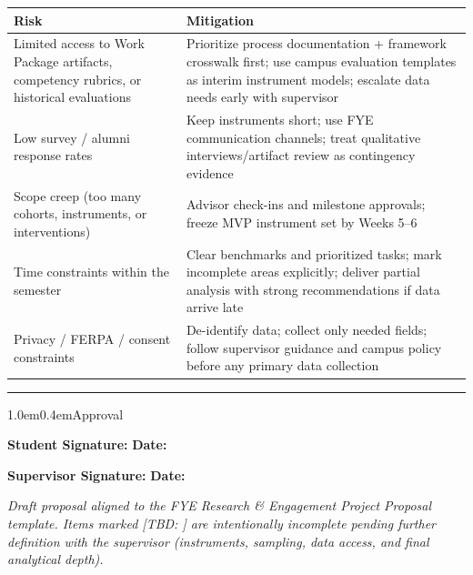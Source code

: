 \documentclass[11pt,letterpaper]{article}
\makeatletter
\newcommand{\sectionrule}{\par\vspace{0.4em}\noindent\rule{\textwidth}{0.6pt}\vspace{0.55em}}
\newcommand{\tbdtxt}[1]{%
  \textit{[TBD\if\relax\detokenize{#1}\relax\else: #1\fi]}%
}
\renewcommand\section{\@startsection{section}{1}{\z@}%
  {1.0em}{0.4em}{\large\bfseries}}
\makeatother
\begin{document}
\noindent
\renewcommand{\arraystretch}{1.3}
\begin{tabularx}{\textwidth}{| >{\raggedright\arraybackslash}p{} | >{\raggedright\arraybackslash}X |}
\hline
\textbf{Risk} & \textbf{Mitigation} \\
\hline
Limited access to Work Package artifacts, competency rubrics, or historical evaluations
& Prioritize process documentation + framework crosswalk first; use campus evaluation templates as interim instrument models; escalate data needs early with supervisor \\
\hline
Low survey / alumni response rates
& Keep instruments short; use FYE communication channels; treat qualitative interviews/artifact review as contingency evidence \\
\hline
Scope creep (too many cohorts, instruments, or interventions)
& Advisor check-ins and milestone approvals; freeze MVP instrument set by Weeks 5--6 \\
\hline
Time constraints within the semester
& Clear benchmarks and prioritized tasks; mark incomplete areas explicitly; deliver partial analysis with strong recommendations if data arrive late \\
\hline
Privacy / FERPA / consent constraints
& De-identify data; collect only needed fields; follow supervisor guidance and campus policy before any primary data collection \\
\hline
\end{tabularx}
\renewcommand{\arraystretch}{1.0}

\sectionrule

\section{Approval}

\vspace{1.2em}
\noindent\textbf{Student Signature:} \underline{\hspace{2.8in}}
\hfill\textbf{Date:} \underline{\hspace{1.3in}}

\vspace{1.5em}
\noindent\textbf{Supervisor Signature:} \underline{\hspace{2.6in}}
\hfill\textbf{Date:} \underline{\hspace{1.3in}}

\vspace{1.4em}
{\footnotesize\textit{Draft proposal aligned to the FYE Research \& Engagement Project Proposal template. Items marked \tbdtxt{} are intentionally incomplete pending further definition with the supervisor (instruments, sampling, data access, and final analytical depth).}}
\end{document}
